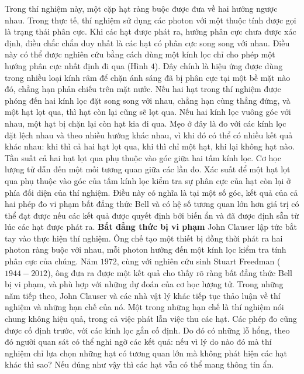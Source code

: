 \begin{multicols}{2}
	\vskip 0.1cm
	Trong thí nghiệm này, một cặp hạt ràng buộc được đưa về hai hướng ngược nhau. Trong thực tế, thí nghiệm sử dụng các photon với một thuộc tính được gọi là trạng thái phân cực. Khi các hạt được phát ra, hướng phân cực chưa được xác định, điều chắc chắn duy nhất là các hạt có phân cực song song với nhau. Điều này có thể được nghiên cứu bằng cách dùng một kính lọc chỉ cho phép một hướng phân cực nhất định đi qua (Hình $4$). Đây chính là hiệu ứng được dùng trong nhiều loại kính râm để chặn ánh sáng đã bị phân cực tại một bề mặt nào đó, chẳng hạn phản chiếu trên mặt nước.
	\vskip 0.1cm
	Nếu hai hạt trong thí nghiệm được phóng đến hai kính lọc đặt song song với nhau, chẳng hạn cùng thẳng đứng, và một hạt lọt qua, thì hạt còn lại cũng sẽ lọt qua. Nếu hai kính lọc vuông góc với nhau, một hạt bị chặn lại còn hạt kia đi qua. Mẹo ở đây là đo với các kính lọc đặt lệch nhau và theo nhiều hướng khác nhau, vì khi đó có thể có nhiều kết quả khác nhau: khi thì cả hai hạt lọt qua, khi thì chỉ một hạt, khi lại không hạt nào. Tần suất cả hai hạt lọt qua phụ thuộc vào góc giữa hai tấm kính lọc.
	\vskip 0.1cm
	Cơ học lượng tử dẫn đến một mối tương quan giữa các lần đo. Xác suất để một hạt lọt qua phụ thuộc vào góc của tấm kính lọc kiểm tra sự phân cực của hạt còn lại ở phía đối diện của thí nghiệm. Điều này có nghĩa là tại một số góc, kết quả của cả hai phép đo vi phạm bất đẳng thức Bell và có hệ số tương quan lớn hơn giá trị có thể đạt được nếu các kết quả được quyết định bởi biến ẩn và đã được định sẵn từ lúc các hạt được phát ra.
	\vskip 0.1cm
	\textbf{\color{timhieukhoahoc}Bất đẳng thức bị vi phạm}
	\vskip 0.1cm
	John Clauser lập tức bắt tay vào thực hiện thí nghiệm. Ông chế tạo một thiết bị đồng thời phát ra hai photon ràng buộc với nhau, mỗi photon hướng đến một kính lọc kiểm tra tính phân cực của chúng. Năm $1972$, cùng với nghiên cứu sinh Stuart Freedman ($1944 - 2012$), ông đưa ra được một kết quả cho thấy rõ ràng bất đẳng thức Bell bị vi phạm, và phù hợp với những dự đoán của cơ học lượng tử.
	\vskip 0.1cm
	Trong những năm tiếp theo, John Clauser và các nhà vật lý khác tiếp tục thảo luận về thí nghiệm và những hạn chế của nó. Một trong những hạn chế là thí nghiệm nói chung không hiệu quả, trong cả việc phát lẫn việc thu các hạt. Các phép đo cũng được cố định trước, với các kính lọc gắn cố định. Do đó có những lỗ hổng, theo đó người quan sát có thể nghi ngờ các kết quả: nếu vì lý do nào đó mà thí nghiệm chỉ lựa chọn những hạt có tương quan lớn mà không phát hiện các hạt khác thì sao? Nếu đúng như vậy thì các hạt vẫn có thể mang thông tin ẩn.
	\vskip 0.1cm

\end{multicols}
